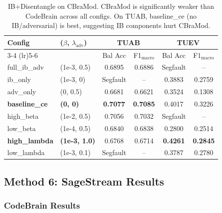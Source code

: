 \documentclass{article}
\begin{document}
\begin{table}[h]
\centering
\small
\begin{tabular}{@{}llcccc@{}}
\toprule
Config & ($\beta$, $\lambda_\text{adv}$) & \multicolumn{2}{c}{TUAB} & \multicolumn{2}{c}{TUEV} \\
\cmidrule(lr){3-4} \cmidrule(lr){5-6}
& & Bal Acc & F1$_\text{macro}$ & Bal Acc & F1$_\text{macro}$ \\
\midrule
full\_ib\_adv & (1e-3, 0.5) & 0.6895 & 0.6886 & Segfault & -- \\
ib\_only & (1e-3, 0) & Segfault & -- & 0.3883 & 0.2759 \\
adv\_only & (0, 0.5) & 0.6681 & 0.6621 & 0.3524 & 0.1308 \\
\textbf{baseline\_ce} & \textbf{(0, 0)} & \textbf{0.7077} & \textbf{0.7085} & 0.4017 & 0.3226 \\
high\_beta & (1e-2, 0.5) & 0.7056 & 0.7032 & Segfault & -- \\
low\_beta & (1e-4, 0.5) & 0.6840 & 0.6838 & 0.2800 & 0.2514 \\
\textbf{high\_lambda} & \textbf{(1e-3, 1.0)} & 0.6768 & 0.6714 & \textbf{0.4261} & \textbf{0.2845} \\
low\_lambda & (1e-3, 0.1) & Segfault & -- & 0.3787 & 0.2780 \\
\bottomrule
\end{tabular}
\caption{IB+Disentangle on CBraMod. CBraMod is significantly weaker than CodeBrain across all configs. On TUAB, baseline\_ce (no IB/adversarial) is best, suggesting IB components hurt CBraMod.}
\end{table}

\subsection{Method 6: SageStream Results}

\subsubsection{CodeBrain Results}
\end{document}
